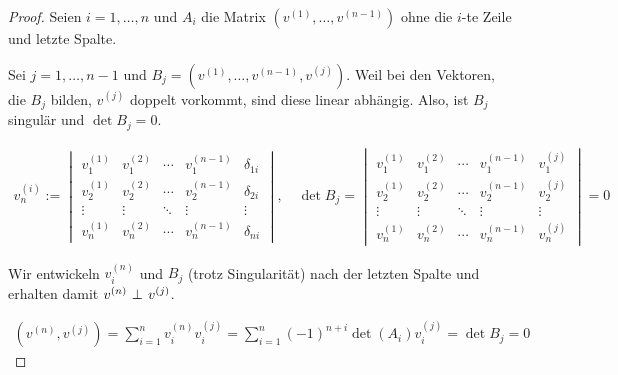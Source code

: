 \begin{proof}

Seien $i = 1, \ldots, n$ und $A_i$ die Matrix $(v^{(1)}, \ldots, v^{(n-1)})$ ohne die $i$-te Zeile und letzte Spalte.

Sei $j = 1, \ldots, n-1$ und $B_j = (v^{(1)}, \ldots, v^{(n-1)}, v^{(j)})$.
Weil bei den Vektoren, die $B_j$ bilden, $v^{(j)}$ doppelt vorkommt, sind diese linear abhängig.
Also, ist $B_j$ singulär und $\det{B_j} = 0$.

\begin{align*}
  v^{(i)}_n
  :=
  \begin{vmatrix}
    v^{(1)}_1 & v^{(2)}_1 & \cdots & v^{(n-1)}_1 & \delta_{1 i} \\
    v^{(1)}_2 & v^{(2)}_2 & \cdots & v^{(n-1)}_2 & \delta_{2 i} \\
    \vdots    & \vdots    & \ddots & \vdots      & \vdots \\
    v^{(1)}_n & v^{(2)}_n & \cdots & v^{(n-1)}_n & \delta_{n i}
  \end{vmatrix},
  \quad
  \det{B_j}
  =
  \begin{vmatrix}
    v^{(1)}_1 & v^{(2)}_1 & \cdots & v^{(n-1)}_1 & v^{(j)}_1 \\
    v^{(1)}_2 & v^{(2)}_2 & \cdots & v^{(n-1)}_2 & v^{(j)}_2 \\
    \vdots    & \vdots    & \ddots & \vdots      & \vdots \\
    v^{(1)}_n & v^{(2)}_n & \cdots & v^{(n-1)}_n & v^{(j)}_n
  \end{vmatrix}
  = 0
\end{align*}

Wir entwickeln $v^{(n)}_i$ und $B_j$ (trotz Singularität) nach der letzten Spalte und erhalten damit $v^{(n)} ~\bot_{}~ v^{(j)}$.

\begin{align*}
  (v^{(n)}, v^{(j)})
  =
  \sum_{i=1}^n
  v^{(n)}_i
  v^{(j)}_i
  =
  \sum_{i=1}^n
  (-1)^{n + i} \det{(A_i)}
  v^{(j)}_i
  =
  \det{B_j} = 0
\end{align*}

\end{proof}
